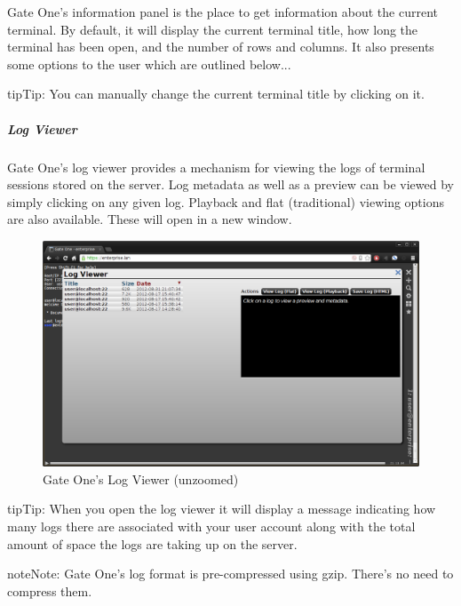 \documentclass[letterpaper,10pt,openany]{sphinxmanual}
\begin{document}
Gate One's information panel is the place to get information about the current terminal.  By default, it will display the current terminal title, how long the terminal has been open, and the number of rows and columns.  It also presents some options to the user which are outlined below...

\begin{notice}{tip}{Tip:}
You can manually change the current terminal title by clicking on it.
\end{notice}


\subparagraph{Log Viewer}
\label{Applications/terminal/userguide:log-viewer}
Gate One's log viewer provides a mechanism for viewing the logs of terminal sessions stored on the server.  Log metadata as well as a preview can be viewed by simply clicking on any given log.  Playback and flat (traditional) viewing options are also available.  These will open in a new window.
\begin{figure}[htbp]
\centering
\capstart

\includegraphics{gateone_log_viewer.png}
\caption{Gate One's Log Viewer (unzoomed)}\end{figure}

\begin{notice}{tip}{Tip:}
When you open the log viewer it will display a message indicating how many logs there are associated with your user account along with the total amount of space the logs are taking up on the server.
\end{notice}

\begin{notice}{note}{Note:}
Gate One's log format is pre-compressed using gzip.  There's no need to compress them.
\end{notice}
\end{document}
